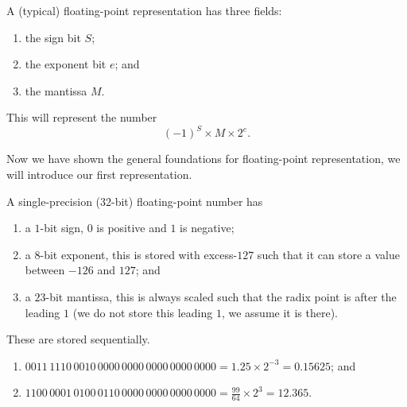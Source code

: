 \begin{definition}
	A (typical) floating-point representation has three fields:
	\begin{enumerate}
		\item the sign bit $S$;
		\item the exponent bit $e$; and
		\item the mantissa $M$.
	\end{enumerate}
	This will represent the number \[(-1)^S \times M \times 2^e.\]
\end{definition}

Now we have shown the general foundations for floating-point representation,
we will introduce our first representation.

\begin{definition}
	A single-precision (32-bit) floating-point number has
	\begin{enumerate}
		\item a $1$-bit sign, $0$ is positive and $1$ is negative;
		\item a $8$-bit exponent, this is stored with excess-$127$ 
			such that it can store a value between $-126$ and $127$; and
		\item a $23$-bit mantissa, this is always scaled such that the
			radix point is after the leading $1$ (we do not store this leading
			$1$, we assume it is there).
	\end{enumerate}
	These are stored sequentially.
\end{definition}

\begin{examples}
	\begin{enumerate}
		\item $0011\,1110\,0010\,0000\,0000\,0000\,0000\,0000 
			= 1.25 \times 2^{-3} = 0.15625$; and
		\item $1100\,0001\,0100\,0110\,0000\,0000\,0000\,0000
			= \frac{99}{64} \times 2^3 = 12.365$.
	\end{enumerate}
\end{examples}